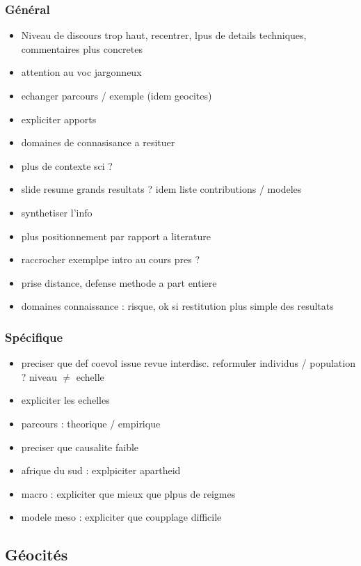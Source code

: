 \documentclass[11pt]{article}
\begin{document}
\subsubsection*{Général}

\begin{itemize}
	\item Niveau de discours trop haut, recentrer, lpus de details techniques, commentaires plus concretes
	\item attention au voc jargonneux
	\item echanger parcours / exemple (idem geocites)
	\item expliciter apports
	\item domaines de connasisance a resituer
	\item plus de contexte sci ?
	\item slide resume grands resultats ? idem liste contributions / modeles
	\item synthetiser l'info
	\item plus positionnement par rapport a literature
	\item raccrocher exemplpe intro au cours pres ?
	\item prise distance, defense methode a part entiere
	\item domaines connaissance : risque, ok si restitution plus simple des resultats
\end{itemize}


\subsubsection*{Spécifique}

\begin{itemize}
	\item preciser que def coevol issue revue interdisc. reformuler individus / population ? niveau $\neq$ echelle
	\item expliciter les echelles
	\item parcours : theorique / empirique
	\item preciser que causalite faible
	\item afrique du sud : explpiciter apartheid
	\item macro : expliciter que mieux que plpus de reigmes
	\item modele meso : expliciter que coupplage difficile
\end{itemize}



\subsection*{Géocités}
\end{document}
